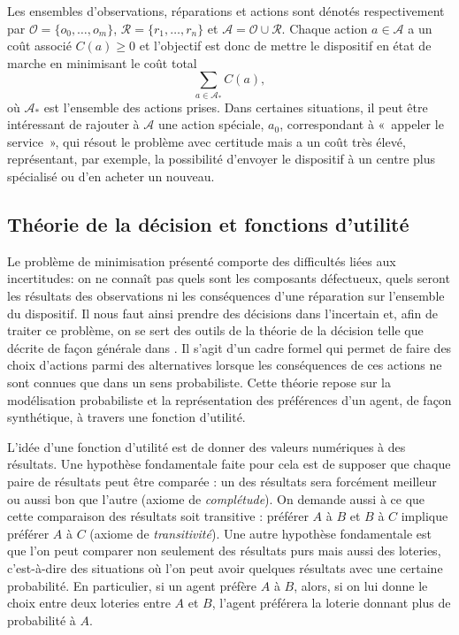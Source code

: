 \documentclass[a4paper,11pt]{article}
\theoremstyle{plain}
\theoremstyle{definition}
\begin{document}
Les ensembles d'observations, réparations et actions sont dénotés respectivement par $\mathcal O = \{ o_0, \dotsc, o_m\}$, $\mathcal R = \{r_1, \dotsc, r_n\}$ et $\mathcal A = \mathcal O \cup \mathcal R$. Chaque action $a \in \mathcal A$ a un coût associé $C(a) \geq 0$ et l'objectif est donc de mettre le dispositif en état de marche en minimisant le coût total \[\sum_{a \in \mathcal A_\ast} C(a),\] où $\mathcal A_\ast$ est l'ensemble des actions prises. Dans certaines situations, il peut être intéressant de rajouter à $\mathcal A$ une action spéciale, $a_0$, correspondant à «~appeler le service~», qui résout le problème avec certitude mais a un coût très élevé, représentant, par exemple, la possibilité d'envoyer le dispositif à un centre plus spécialisé ou d'en acheter un nouveau.

\subsection{Théorie de la décision et fonctions d'utilité}


Le problème de minimisation présenté comporte des difficultés liées aux incertitudes: on ne connaît pas quels sont les composants défectueux, quels seront les résultats des observations ni les conséquences d'une réparation sur l'ensemble du dispositif. Il nous faut ainsi prendre des décisions dans l'incertain et, afin de traiter ce problème, on se sert des outils de la théorie de la décision telle que décrite de façon générale dans \cite{North_1968}. Il s'agit d'un cadre formel qui permet de faire des choix d'actions parmi des alternatives lorsque les conséquences de ces actions ne sont connues que dans un sens probabiliste. Cette théorie repose sur la modélisation probabiliste et la représentation des préférences d'un agent, de façon synthétique, à travers une fonction d'utilité. 

L'idée d'une fonction d'utilité est de donner des valeurs numériques à des résultats. Une hypothèse fondamentale faite pour cela est de supposer que chaque paire de résultats peut être comparée : un des résultats sera forcément meilleur ou aussi bon que l'autre (axiome de \emph{complétude}). On demande aussi à ce que cette comparaison des résultats soit transitive : préférer $A$ à $B$ et $B$ à $C$ implique préférer $A$ à $C$ (axiome de \emph{transitivité}).
Une autre hypothèse fondamentale est que l'on peut comparer non seulement des résultats purs mais aussi des loteries, c'est-à-dire des situations où l'on peut avoir quelques résultats avec une certaine probabilité. En particulier, si un agent préfère $A$ à $B$, alors, si on lui donne le choix entre deux loteries entre $A$ et $B$, l'agent préférera la loterie donnant plus de probabilité à $A$. 
\end{document}
